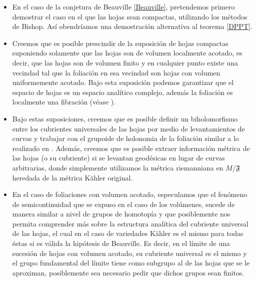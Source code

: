 \documentclass{article}
\begin{document}
\begin{itemize}
        \item En el caso de la conjetura de Beauville \ref{Beauville}, pretendemos primero demostrar el caso en el que 
        las hojas sean compactas, utilizando los m\'etodos de Bishop. As\'i obendr\'iamos una demostraci\'on alternativa al
        teorema \ref{DPPT}.

        \item  Creemos que es posible prescindir de la suposici\'on de hojas compactas suponiendo solamente que las 
        hojas son de volumen localmente acotado, es decir, que las hojas son de volumen finito y en cualquier punto existe
        una vecindad tal que la foliaci\'on en esa vecindad son hojas con volumen uniformemente acotado. Bajo esta 
        suposici\'on podemos garantizar que el espacio de hojas es un espacio anal\'itico complejo, adem\'as la foliaci\'on es 
        localmente una fibraci\'on (v\'ease \cite{A-V}). 
        
        \item Bajo estas suposiciones, creemos que es posible definir un biholomorfismo entre los cubrientes universales 
        de las hojas por medio de levantamientos de curvas y trabajar con el grupoide de holonomia de la foliaci\'on 
        similar a lo realizado en \cite{DPPT}. Adem\'as, creemos que es posible extraer informaci\'on m\'etrica de las
        hojas (o su cubriente) si se levantan geod\'esicas en lugar de curvas arbitrarias, donde simplemente utilizamos la 
        m\'etrica riemanniana en $M/\mathfrak{F}$ heredada de la m\'etrica K\"ahler original. 
        
        \item En el caso de foliaciones con volumen acotado, especulamos que el fen\'omeno de semicontinuidad que se expuso en el caso
        de los vol\'umenes, sucede de manera similar a nivel de grupos de homotop\'ia y que posiblemente nos permita comprender m\'as sobre la estructura 
        anal\'itica del cubriente universal de las hojas, el cual en el caso de variedades K\"ahler es el mismo para todas \'estas
        si es v\'alida la hip\'otesis de Beauville. Es decir, en el l\'imite de una sucesi\'on de hojas con volumen acotado, su cubriente
        universal es el mismo y el grupo fundamental del l\'imite tiene como subgrupo al de las hojas que se le aproximan,
        posiblemente sea necesario pedir que dichos grupos sean finitos.


\end{itemize}
\end{document}
